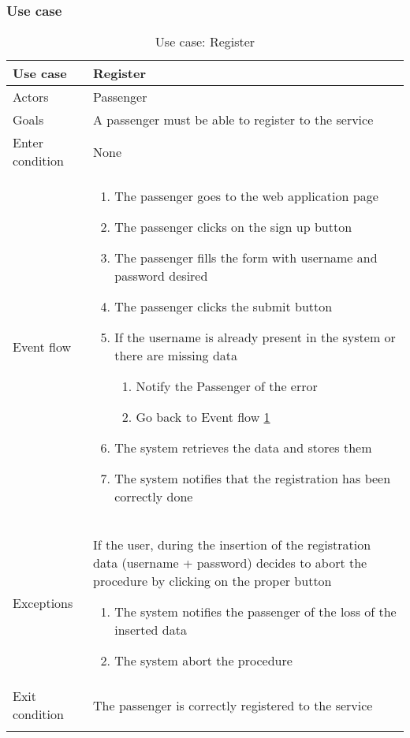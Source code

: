 \subsubsection{Use case}
\begin{center}
\centering
\begin{longtable}{| p{} | p{} |} \hline
Use case & \textbf{Register} \\ \hline 
Actors & Passenger \\ \hline
Goals & A passenger must be able to register to the service \\ \hline
Enter condition & None \\ \hline
Event flow & \begin{enumerate}
				\item The passenger goes to the web application page
				\item The passenger clicks on the sign up button
				\item \label{fillForm1} The passenger fills the form with username and password desired
				\item The passenger clicks the submit button
				\item If the username is already present in the system or there are missing data
				\begin{enumerate}
					\item Notify the Passenger of the error
					\item Go back to Event flow \ref{fillForm1}
				\end{enumerate}	
				\item The system retrieves the data and stores them
				\item The system notifies that the registration has been correctly done
			\end{enumerate} \\ \hline
Exceptions & If the user, during the insertion of the registration data (username + password) decides to abort the procedure by clicking on the proper button
			\begin{enumerate}
				\item The system notifies the passenger of the loss of the inserted data
				\item The system abort the procedure
			\end{enumerate}\\ \hline
Exit condition & The passenger is correctly registered to the service \\ \hline
\caption{Use case: Register}
\end{longtable}
\end{center}
